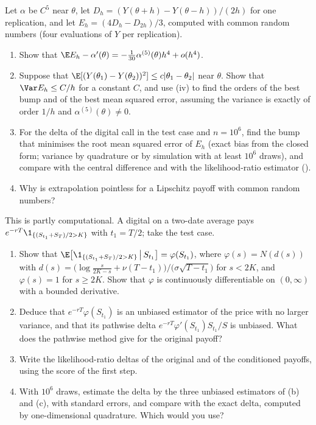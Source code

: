 \begin{exercise}\label{ex:gr-extrapolation}
\medium Let $\alpha$ be $C^5$ near $\theta$, let $D_h=(Y(\theta+h)-Y(\theta-h))/(2h)$ for one
replication, and let $E_h=(4D_h-D_{2h})/3$, computed with common random numbers (four evaluations
of $Y$ per replication).
\begin{enumerate}[label=(\alph*)]
  \item Show that $\E E_h-\alpha'(\theta)=-\frac1{30}\alpha^{(5)}(\theta)h^4+o(h^4)$.
  \item Suppose that $\E[(Y(\theta_1)-Y(\theta_2))^2]\le c|\theta_1-\theta_2|$ near $\theta$. Show
    that $\Var E_h\le C/h$ for a constant $C$, and use (iv)
    to find the orders of the best bump and of the best mean squared error, assuming the variance
    is exactly of order $1/h$ and $\alpha^{(5)}(\theta)\ne0$.
  \item For the delta of the digital call in the test case and $n=10^6$, find the bump that
    minimises the root mean squared error of $E_h$ (exact bias from the closed form; variance by
    quadrature or by simulation with at least $10^6$ draws), and compare with the central
    difference and with the likelihood-ratio estimator ().
  \item Why is extrapolation pointless for a Lipschitz payoff with common random numbers?
\end{enumerate}
\end{exercise}

\begin{exercise}\label{ex:gr-smoothing}
\medium This is partly computational. A digital on a two-date average pays
$e^{-rT}\1_{\{(S_{t_1}+S_T)/2>K\}}$ with $t_1=T/2$; take the test case.
\begin{enumerate}[label=(\alph*)]
  \item Show that $\E\big[\1_{\{(S_{t_1}+S_T)/2>K\}}\,\big|\,S_{t_1}\big]=\varphi(S_{t_1})$, where
    $\varphi(s)=N(d(s))$ with
    $d(s)=\big(\log\frac{s}{2K-s}+\nu(T-t_1)\big)/\big(\sigma\sqrt{T-t_1}\big)$ for $s<2K$, and
    $\varphi(s)=1$ for $s\ge2K$. Show that $\varphi$ is continuously differentiable on
    $(0,\infty)$ with a bounded derivative.
  \item Deduce that $e^{-rT}\varphi(S_{t_1})$ is an unbiased estimator of the price with no
    larger variance, and that its pathwise delta $e^{-rT}\varphi'(S_{t_1})S_{t_1}/S$ is unbiased.
    What does the pathwise method give for the original payoff?
  \item Write the likelihood-ratio deltas of the original and of the conditioned payoffs, using
    the score of the first step.
  \item With $10^6$ draws, estimate the delta by the three unbiased estimators of (b) and (c),
    with standard errors, and compare with the exact delta, computed by one-dimensional
    quadrature. Which would you use?
\end{enumerate}
\end{exercise}

